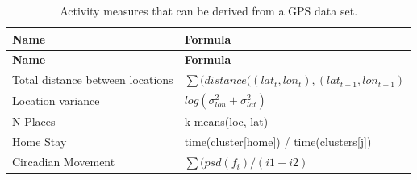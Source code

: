\documentclass[]{book}
\begin{document}
\begin{longtable}[]{@{}ll@{}}
\caption{\label{tab:GPSfeatures} Activity measures that can be derived from
a GPS data set.}\tabularnewline
\toprule
\begin{minipage}[b]{0.34\columnwidth}\raggedright\strut
\textbf{Name}\strut
\end{minipage} & \begin{minipage}[b]{0.60\columnwidth}\raggedright\strut
\textbf{Formula}\strut
\end{minipage}\tabularnewline
\midrule
\endfirsthead
\toprule
\begin{minipage}[b]{0.34\columnwidth}\raggedright\strut
\textbf{Name}\strut
\end{minipage} & \begin{minipage}[b]{0.60\columnwidth}\raggedright\strut
\textbf{Formula}\strut
\end{minipage}\tabularnewline
\midrule
\endhead
\begin{minipage}[t]{0.34\columnwidth}\raggedright\strut
Total distance between locations\strut
\end{minipage} & \begin{minipage}[t]{0.60\columnwidth}\raggedright\strut
\(\sum(distance((lat_{t}, lon_{t}), (lat_{t-1}, lon_{t-1})\)\strut
\end{minipage}\tabularnewline
\begin{minipage}[t]{0.34\columnwidth}\raggedright\strut
Location variance\strut
\end{minipage} & \begin{minipage}[t]{0.60\columnwidth}\raggedright\strut
\(log(\sigma_{lon}^2 + \sigma_{lat}^2)\)\strut
\end{minipage}\tabularnewline
\begin{minipage}[t]{0.34\columnwidth}\raggedright\strut
N Places\strut
\end{minipage} & \begin{minipage}[t]{0.60\columnwidth}\raggedright\strut
k-means(loc, lat)\strut
\end{minipage}\tabularnewline
\begin{minipage}[t]{0.34\columnwidth}\raggedright\strut
Home Stay\strut
\end{minipage} & \begin{minipage}[t]{0.60\columnwidth}\raggedright\strut
time(cluster{[}home{]}) / time(clusters{[}j{]})\strut
\end{minipage}\tabularnewline
\begin{minipage}[t]{0.34\columnwidth}\raggedright\strut
Circadian Movement\strut
\end{minipage} & \begin{minipage}[t]{0.60\columnwidth}\raggedright\strut
\(\sum(psd(f_i) / (i1 - i2)\)\strut
\end{minipage}\tabularnewline
\bottomrule
\end{longtable}
\end{document}
